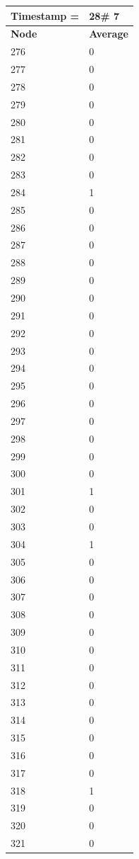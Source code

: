 \begin{tabular}{|l||l|}
\hline
\textbf{Timestamp =} & \textbf{28}\# 7\\\hline
	\textbf{Node} & \textbf{Average} \\ \hline
\hline
	276 & 0 \\ \hline
	277 & 0 \\ \hline
	278 & 0 \\ \hline
	279 & 0 \\ \hline
	280 & 0 \\ \hline
	281 & 0 \\ \hline
	282 & 0 \\ \hline
	283 & 0 \\ \hline
	284 & 1 \\ \hline
	285 & 0 \\ \hline
	286 & 0 \\ \hline
	287 & 0 \\ \hline
	288 & 0 \\ \hline
	289 & 0 \\ \hline
	290 & 0 \\ \hline
	291 & 0 \\ \hline
	292 & 0 \\ \hline
	293 & 0 \\ \hline
	294 & 0 \\ \hline
	295 & 0 \\ \hline
	296 & 0 \\ \hline
	297 & 0 \\ \hline
	298 & 0 \\ \hline
	299 & 0 \\ \hline
	300 & 0 \\ \hline
	301 & 1 \\ \hline
	302 & 0 \\ \hline
	303 & 0 \\ \hline
	304 & 1 \\ \hline
	305 & 0 \\ \hline
	306 & 0 \\ \hline
	307 & 0 \\ \hline
	308 & 0 \\ \hline
	309 & 0 \\ \hline
	310 & 0 \\ \hline
	311 & 0 \\ \hline
	312 & 0 \\ \hline
	313 & 0 \\ \hline
	314 & 0 \\ \hline
	315 & 0 \\ \hline
	316 & 0 \\ \hline
	317 & 0 \\ \hline
	318 & 1 \\ \hline
	319 & 0 \\ \hline
	320 & 0 \\ \hline
	321 & 0 \\ \hline
\end{tabular}
